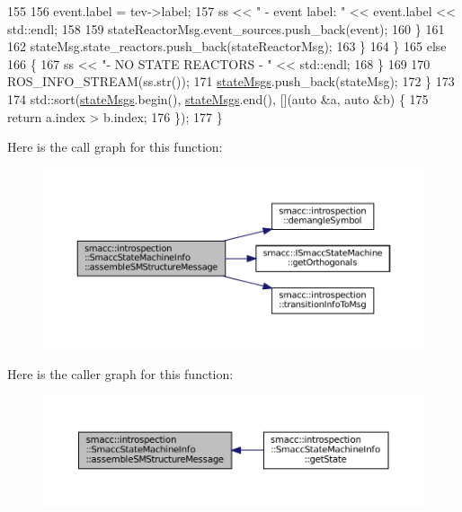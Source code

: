 \begin{DoxyCode}
155 
156                     \textcolor{keyword}{event}.label = tev->label;
157                     ss << \textcolor{stringliteral}{"                 - event label: "} << \textcolor{keyword}{event}.label << std::endl;
158 
159                     stateReactorMsg.event\_sources.push\_back(event);
160                 \}
161 
162                 stateMsg.state\_reactors.push\_back(stateReactorMsg);
163             \}
164         \}
165         \textcolor{keywordflow}{else}
166         \{
167             ss << \textcolor{stringliteral}{"- NO STATE REACTORS - "} << std::endl;
168         \}
169 
170         ROS\_INFO\_STREAM(ss.str());
171         \hyperlink{classsmacc_1_1introspection_1_1SmaccStateMachineInfo_a48e3ff7bbe2673d23e6942234446ebee}{stateMsgs}.push\_back(stateMsg);
172     \}
173 
174     std::sort(\hyperlink{classsmacc_1_1introspection_1_1SmaccStateMachineInfo_a48e3ff7bbe2673d23e6942234446ebee}{stateMsgs}.begin(), \hyperlink{classsmacc_1_1introspection_1_1SmaccStateMachineInfo_a48e3ff7bbe2673d23e6942234446ebee}{stateMsgs}.end(), [](\textcolor{keyword}{auto} &a, \textcolor{keyword}{auto} &b) \{
175         \textcolor{keywordflow}{return} a.index > b.index;
176     \});
177 \}
\end{DoxyCode}
Here is the call graph for this function\+:
\nopagebreak
\begin{figure}[H]
\begin{center}
\leavevmode
\includegraphics[width=350pt]{classsmacc_1_1introspection_1_1SmaccStateMachineInfo_a6758065a8d1faaa7c3688cf0dffe9334_cgraph}
\end{center}
\end{figure}
Here is the caller graph for this function\+:
\nopagebreak
\begin{figure}[H]
\begin{center}
\leavevmode
\includegraphics[width=350pt]{classsmacc_1_1introspection_1_1SmaccStateMachineInfo_a6758065a8d1faaa7c3688cf0dffe9334_icgraph}
\end{center}
\end{figure}
